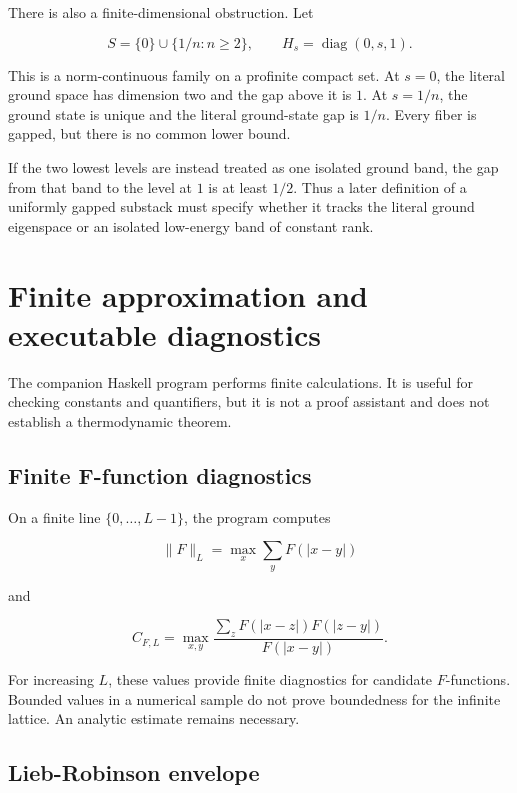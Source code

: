 \documentclass[12pt]{article}
\theoremstyle{definition}
\theoremstyle{remark}
\begin{document}
There is also a finite-dimensional obstruction.  Let

\begin{equation}
  S=\{0\}\cup\{1/n:n\ge2\},
  \qquad
  H_s=\operatorname{diag}(0,s,1).
\end{equation}

This is a norm-continuous family on a profinite compact set.  At $s=0$, the
literal ground space has dimension two and the gap above it is $1$.  At
$s=1/n$, the ground state is unique and the literal ground-state gap is
$1/n$.  Every fiber is gapped, but there is no common lower bound.

If the two lowest levels are instead treated as one isolated ground band, the
gap from that band to the level at $1$ is at least $1/2$.  Thus a later
definition of a uniformly gapped substack must specify whether it tracks the
literal ground eigenspace or an isolated low-energy band of constant rank.

\section{Finite approximation and executable diagnostics}

The companion Haskell program performs finite calculations.  It is useful
for checking constants and quantifiers, but it is not a proof assistant and
does not establish a thermodynamic theorem.

\subsection{Finite F-function diagnostics}

On a finite line $\{0,\ldots,L-1\}$, the program computes

\begin{equation}
  \|F\|_L
  =\max_x\sum_yF(|x-y|)
\end{equation}

and

\begin{equation}
  C_{F,L}
  =\max_{x,y}
  \frac{\sum_zF(|x-z|)F(|z-y|)}{F(|x-y|)}.
\end{equation}

For increasing $L$, these values provide finite diagnostics for candidate
$F$-functions.  Bounded values in a numerical sample do not prove boundedness
for the infinite lattice.  An analytic estimate remains necessary.

\subsection{Lieb-Robinson envelope}
\end{document}
